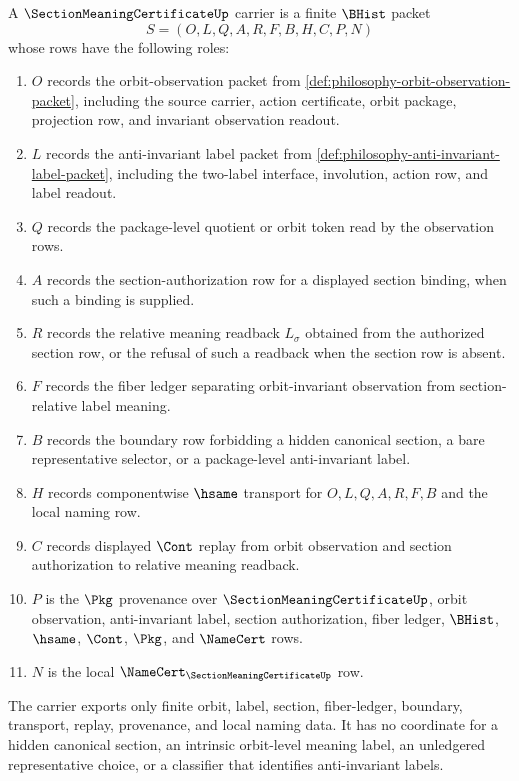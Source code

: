 \begin{definition}
\label{def:section-meaning-certificate-carrier}
A $\SectionMeaningCertificateUp$ carrier is a finite $\BHist$ packet
$$
S=(O,L,Q,A,R,F,B,H,C,P,N)
$$
whose rows have the following roles:
\begin{enumerate}
\item $O$ records the orbit-observation packet from \autoref{def:philosophy-orbit-observation-packet}, including the source carrier, action certificate, orbit package, projection row, and invariant observation readout.
\item $L$ records the anti-invariant label packet from \autoref{def:philosophy-anti-invariant-label-packet}, including the two-label interface, involution, action row, and label readout.
\item $Q$ records the package-level quotient or orbit token read by the observation rows.
\item $A$ records the section-authorization row for a displayed section binding, when such a binding is supplied.
\item $R$ records the relative meaning readback $L_\sigma$ obtained from the authorized section row, or the refusal of such a readback when the section row is absent.
\item $F$ records the fiber ledger separating orbit-invariant observation from section-relative label meaning.
\item $B$ records the boundary row forbidding a hidden canonical section, a bare representative selector, or a package-level anti-invariant label.
\item $H$ records componentwise $\hsame$ transport for $O,L,Q,A,R,F,B$ and the local naming row.
\item $C$ records displayed $\Cont$ replay from orbit observation and section authorization to relative meaning readback.
\item $P$ is the $\Pkg$ provenance over $\SectionMeaningCertificateUp$, orbit observation, anti-invariant label, section authorization, fiber ledger, $\BHist$, $\hsame$, $\Cont$, $\Pkg$, and $\NameCert$ rows.
\item $N$ is the local $\NameCert_{\SectionMeaningCertificateUp}$ row.
\end{enumerate}
The carrier exports only finite orbit, label, section, fiber-ledger, boundary, transport, replay, provenance, and local naming data. It has no coordinate for a hidden canonical section, an intrinsic orbit-level meaning label, an unledgered representative choice, or a classifier that identifies anti-invariant labels.
\end{definition}

